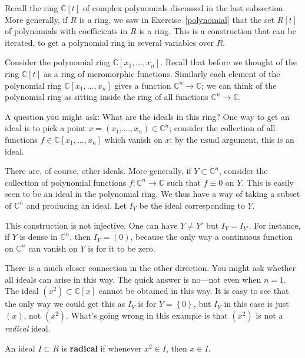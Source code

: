 Recall the ring $\mathbb{C}[t]$ of complex polynomials discussed in the last
subsection. More generally, if $R$ is a ring, we saw in
Exercise~\ref{polynomial} that the set $R[t]$ of polynomials with coefficients
in $R$ is a ring. This is a construction that can be iterated, to get a
polynomial ring in several variables over $R$.

\begin{example} Consider the polynomial ring $\mathbb{C}[x_1, \dots, x_n]$.
Recall that before we thought of the ring $\mathbb{C}[t]$ as a ring of
meromorphic functions. Similarly each element of the polynomial ring
$\mathbb{C}[x_1, \dots, x_n]$ gives a function $\mathbb{C}^n \to \mathbb{C}$;
we can think of the polynomial ring as sitting inside the ring of all functions
$\mathbb{C}^n \to \mathbb{C}$.

A question you might ask: What are the ideals in this ring? One way to get an
ideal is to pick a point $x=(x_1, \dots, x_n) \in \mathbb{C}^n$; consider the
collection of all functions $f \in \mathbb{C}[x_1, \dots, x_n]$ which vanish on
$x$; by the usual argument, this is an ideal.

There are, of course, other ideals. More generally, if $Y \subset
\mathbb{C}^n$, consider the collection of polynomial functions $f: \mathbb{C}^n
\to \mathbb{C}$ such that $f \equiv 0$ on $Y$. This is easily seen to be an
ideal in the polynomial ring. We thus have a way of taking a subset of
$\mathbb{C}^n$ and producing an ideal. Let $I_Y$ be the ideal corresponding to
$Y$.

This construction is not injective. One can have $Y \neq Y'$ but $I_Y =
I_{Y'}$. For instance, if $Y$ is dense in $\mathbb{C}^n$, then $I_Y = (0)$,
because the only way a continuous function on $\mathbb{C}^n$ can vanish on $Y$
is for it to be zero.

There is a much closer connection in the other direction. You might ask whether
all ideals can arise in this way. The quick answer is no---not even when $n=1$.
The ideal $(x^2) \subset \mathbb{C}[x]$ cannot be obtained in this way. It is
easy to see that the only way we could get this as $I_Y$ is for
$Y=\left\{0\right\}$, but $I_Y$ in this case is just $(x)$, not $(x^2)$. What's
going wrong in this example is that $(x^2)$ is not a \emph{radical} ideal.
\end{example}

\begin{definition} An ideal $I \subset R$ is \textbf{radical} if whenever $x^2
\in I$, then $x \in I$. \end{definition}

